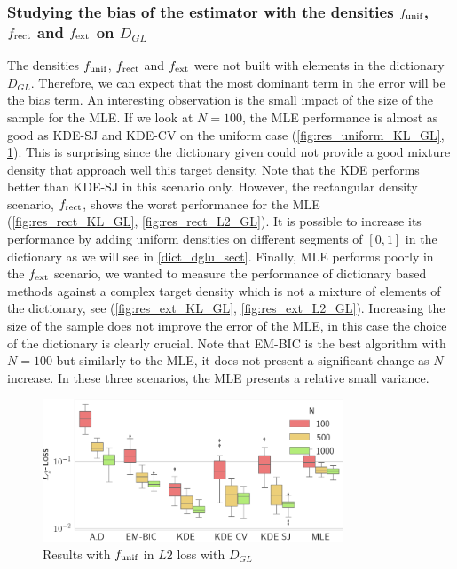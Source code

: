 \subsubsection{Studying the bias of the estimator with the densities $f_{\textnormal{unif}}$, $f_{\textnormal{rect}}$ and $f_{\textnormal{ext}}$ on $D_{GL}$}
The densities $f_{\textnormal{unif}}$, $f_{\textnormal{rect}}$ and $f_{\textnormal{ext}}$ were not built with elements in the dictionary $D_{GL}$. Therefore, we can expect that the most dominant term in the error will be the bias term. An interesting observation is the small impact of the size of the sample for the MLE. If we look at $N=100$, the MLE performance is almost as good as KDE-SJ and KDE-CV on the uniform case (\cref{fig:res_uniform_KL_GL}, \cref{fig:res_uniform_L2_GL}). This is surprising since the dictionary given could not provide a good mixture density that approach well this target density. Note that the KDE performs better than KDE-SJ in this scenario only. However, the rectangular density scenario, $f_{\textnormal{rect}}$, shows the worst performance for the MLE (\cref{fig:res_rect_KL_GL}, \cref{fig:res_rect_L2_GL}). It is possible to increase its performance by adding uniform densities on different segments of $[0,1]$ in the dictionary as we will see in \cref{dict_dglu_sect}. Finally, MLE performs poorly in the $f_{\textnormal{ext}}$ scenario, we wanted to measure the performance of dictionary based methods against a complex target density which is not a mixture of elements of the dictionary, see (\cref{fig:res_ext_KL_GL}, \cref{fig:res_ext_L2_GL}). Increasing the size of the sample does not improve the error of the MLE, in this case the choice of the dictionary is clearly crucial. Note that EM-BIC is the best algorithm with $N=100$ but similarly to the MLE, it does not present a significant change as $N$ increase. In these three scenarios, the MLE presents a relative small variance.
\begin{figure}
\center
    \includegraphics[width=0.8\textwidth]{./TeX_files/res_uniform_L2_GL.png}
    \caption{Results with $f_{\textnormal{unif}}$ in $L2$ loss with $D_{GL}$}
    \label{fig:res_uniform_L2_GL}
\end{figure}

